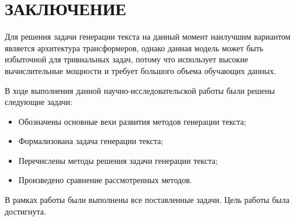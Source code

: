 \chapter*{ЗАКЛЮЧЕНИЕ}

Для решения задачи генерации текста на данный момент наилучшим вариантом является архитектура трансформеров, однако данная модель может быть избыточной для тривиальных задач, потому что использует высокие вычислительные мощности и требует большого объема обучающих данных.

В ходе выполнения данной научно-исследовательской работы были решены следующие задачи:
\begin{itemize}
    \item[---] Обозначены основные вехи развития методов генерации текста;
    \item[---] Формализована задача генерации текста;
    \item[---] Перечислены методы решения задачи генерации текста;
    \item[---] Произведено сравнение рассмотренных методов. 
\end{itemize}

В рамках работы были выполнены все поставленные задачи. Цель работы была достигнута.
